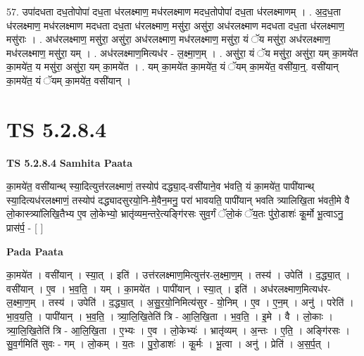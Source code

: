 \documentclass[17pt]{extarticle}
\begin{document}
57. उपा॑दधता दध॒तोपोपा॑ दध॒ता ध॑रलक्ष्माण॒ मध॑रलक्ष्माण मदध॒तोपोपा॑ दध॒ता ध॑रलक्ष्माणम् । . अ॒द॒ध॒ता ध॑रलक्ष्माण॒ मध॑रलक्ष्माण मदधता दध॒ता ध॑रलक्ष्माण॒ मसु॑रा॒ असु॑रा॒ अध॑रलक्ष्माण मदधता दध॒ता ध॑रलक्ष्माण॒ मसु॑राः । . अध॑रलक्ष्माण॒ मसु॑रा॒ असु॑रा॒ अध॑रलक्ष्माण॒ मध॑रलक्ष्माण॒ मसु॑रा॒ यं ॅय मसु॑रा॒ अध॑रलक्ष्माण॒ मध॑रलक्ष्माण॒ मसु॑रा॒ यम् । . अध॑रलक्ष्माण॒मित्यध॑र - ल॒क्ष्मा॒ण॒म् । . असु॑रा॒ यं ॅय मसु॑रा॒ असु॑रा॒ यम् का॒मये॑त का॒मये॑त॒ य मसु॑रा॒ असु॑रा॒ यम् का॒मये॑त । . यम् का॒मये॑त का॒मये॑त॒ यं ॅयम् का॒मये॑त॒ वसी॑या॒न्॒. वसी॑यान् का॒मये॑त॒ यं ॅयम् का॒मये॑त॒ वसी॑यान् । \newline
\pagebreak
{}

\section{ TS 5.2.8.4 }

\textbf{TS 5.2.8.4 } \newline
\textbf{Samhita Paata} \newline

का॒मये॑त॒ वसी॑यान्थ् स्या॒दित्युत्त॑रलक्ष्माणं॒ तस्योप॑ दद्ध्या॒द्-वसी॑याने॒व भ॑वति॒ यं का॒मये॑त॒ पापी॑यान्थ् स्या॒दित्यध॑रलक्ष्माणं॒ तस्योप॑ दद्ध्यादसुरयो॒नि-मे॒वैन॒मनु॒ परा॑ भावयति॒ पापी॑यान् भवति त्र्यालिखि॒ता भ॑वती॒मे वै लो॒कास्त्र्या॑लिखि॒तैभ्य ए॒व लो॒केभ्यो॒ भ्रातृ॑व्यम॒न्तरे॒त्यङ्गि॑रसः सुव॒र्गं ॅलो॒कं ॅय॒तः पु॑रो॒डाशः॑ कू॒र्मो भू॒त्वाऽनु॒ प्रास॑र्प॒ - [  ] \newline

\textbf{Pada Paata} \newline

का॒मये॑त । वसी॑यान् । स्या॒त् । इति॑ । उत्त॑रलक्ष्माण॒मित्युत्त॑र-ल॒क्ष्मा॒ण॒म् । तस्य॑ । उपेति॑ । द॒द्ध्या॒त् । वसी॑यान् । ए॒व । भ॒व॒ति॒ । यम् । का॒मये॑त । पापी॑यान् । स्या॒त् । इति॑ । अध॑रलक्ष्माण॒मित्यध॑र- ल॒क्ष्मा॒ण॒म् । तस्य॑ । उपेति॑ । द॒द्ध्या॒त् । अ॒सु॒र॒यो॒निमित्य॑सुर - यो॒निम् । ए॒व । ए॒न॒म् । अनु॑ । परेति॑ । भा॒व॒य॒ति॒ । पापी॑यान् । भ॒व॒ति॒ । त्र्या॒लि॒खि॒तेति॑ त्रि - आ॒लि॒खि॒ता । भ॒व॒ति॒ । इ॒मे । वै । लो॒काः । त्र्या॒लि॒खि॒तेति॑ त्रि - आ॒लि॒खि॒ता । ए॒भ्यः । ए॒व । लो॒केभ्यः॑ । भ्रातृ॑व्यम् । अ॒न्तः । ए॒ति॒ । अङ्गि॑रसः । सु॒व॒र्गमिति॑ सुवः - गम् । लो॒कम् । य॒तः । पु॒रो॒डाशः॑ । कू॒र्मः । भू॒त्वा । अनु॑ । प्रेति॑ । अ॒स॒र्प॒त् ।  \newline
\end{document}
